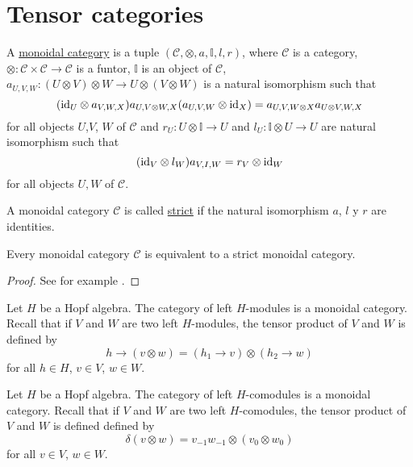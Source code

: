 \section{Tensor categories}

\begin{definition}
A \underline{monoidal category} is a tuple
$(\mathcal{C},\otimes,a,\mathbb{I},l,r)$, where $\mathcal{C}$ is a category,
$\otimes:\mathcal{C}\times\mathcal{C}\to\mathcal{C}$ is a funtor, $\mathbb{I}$
is an object of $\mathcal{C}$, $a_{U,V,W}:(U\otimes V)\otimes W\to
U\otimes(V\otimes W)$ is a natural isomorphism such that 
\begin{equation}
(\id_{U}\otimes a_{V,W,X})a_{U,V\otimes W,X}(a_{U,V,W}\otimes\id_{X})=a_{U,V,W\otimes X}a_{U\otimes V,W,X}\label{eq:pentagon}
\end{equation}
for all objects $U$,$V$, $W$ of $\mathcal{C}$ and $r_{U}:U\otimes\mathbb{I}\to U$
and $l_{U}:\mathbb{I}\otimes U\to U$ are natural isomorphism such
that 
\begin{equation}
(\id_{V}\otimes l_{W})a_{V,I,W}=r_{V}\otimes\id_{W}\label{eq:triangles}
\end{equation}
for all objects $U,W$ of $\mathcal{C}$.
\end{definition}

\begin{definition}
A monoidal category $\mathcal{C}$ is called \underline{strict} if the natural
isomorphism $a$, $l$ y $r$ are identities. 
\end{definition}

\begin{theorem}
Every monoidal category $\mathcal{C}$ is equivalent to a strict monoidal
category.
\end{theorem}

\begin{proof}
See for example \cite[Theorem XI.5.3]{MR1321145}.
\end{proof}

\begin{example}
Let $H$ be a Hopf algebra. The category of left $H$-modules is a monoidal
category.  Recall that if $V$ and $W$ are two left $H$-modules, the tensor
product of $V$ and $W$ is defined by 
\[
h\rightarrow(v\otimes w)=(h_{1}\rightarrow v)\otimes(h_{2}\rightarrow w)
\]
for all $h\in H$, $v\in V$, $w\in W$. 
\end{example}

\begin{example}
Let $H$ be a Hopf algebra. The category of left $H$-comodules is a monoidal
category.  Recall that if $V$ and $W$ are two left $H$-comodules, the tensor
product of $V$ and $W$ is defined defined by 
\[
\delta(v\otimes w)=v_{-1}w_{-1}\otimes(v_0\otimes w_0)
\]
for all $v\in V$, $w\in W$.
\end{example}

